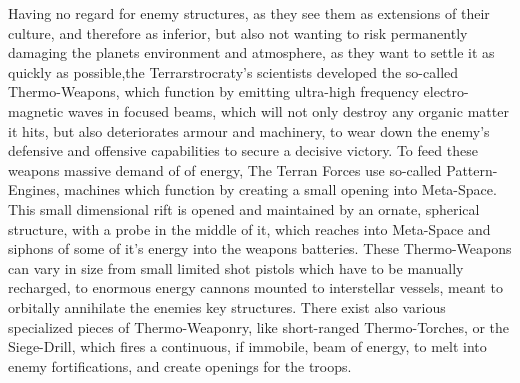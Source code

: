 \documentclass[a4paper,12pt]{report}
\begin{document}
Having no regard for enemy structures, as they see them as extensions of their culture, and therefore as inferior, but also not wanting to risk permanently damaging the planets environment and atmosphere, as they want to settle it as quickly as possible,the Terrarstrocraty's scientists developed the so-called Thermo-Weapons, which function by emitting ultra-high frequency electro-magnetic waves in focused beams, which will not only destroy any organic matter it hits, but also deteriorates armour and machinery, to wear down the enemy's defensive and offensive capabilities to secure a decisive victory. To feed these weapons massive demand of of energy, The Terran Forces use so-called Pattern-Engines, machines which function by creating a small opening into Meta-Space. This small dimensional rift is opened and maintained by an ornate, spherical structure, with a probe in the middle of it, which reaches into Meta-Space and siphons of some of it's energy into the weapons batteries. These Thermo-Weapons can vary in size from small limited shot pistols which have to be manually recharged, to enormous energy cannons mounted to interstellar vessels, meant to orbitally annihilate the enemies key structures. There exist also various specialized pieces of Thermo-Weaponry, like short-ranged Thermo-Torches, or the Siege-Drill, which fires a continuous, if immobile, beam of energy, to melt into enemy fortifications, and create openings for the troops.\\
\\
\end{document}
